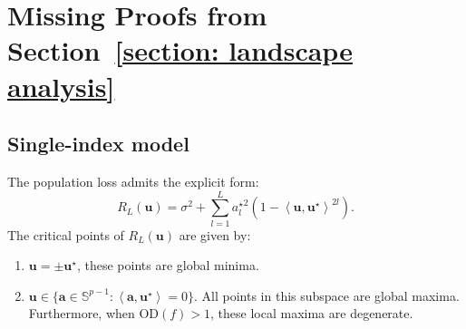 \documentclass[final,12pt]{colt2018} %
\newcommand{\sd}[1]{\text{OD}(#1)}
\newcommand{\unitsphere}[1]{\mathbb{S}^{#1}}
\renewcommand\v[1]{{\ensuremath{\boldsymbol{#1}}}}
\newcommand\ip[1]{\left\langle #1 \right\rangle}
\begin{document}





\appendix

\section{Missing Proofs from Section~\ref{section: landscape analysis}}
\label{section: proofs for landscape analysis}

\subsection{Single-index model}

\begin{theorem}
\label{theorem: landscape_population_loss_restate}
The population loss admits the explicit form: 
$$R_L(\v u)  = \sigma^2 + \sum_{l=1}^L {a_l^\star}^2 (1-\ip{\v u, \v u^\star}^{2l}). $$
The critical points of $ R_L(\v u)$ are given by:
\begin{enumerate}
    \item $\v u = \pm \v u^\star$, these points are global minima. 
    \item $\v u \in \{ \v a \in \unitsphere{p-1}: \ip{\v a, \v u^\star} = 0\}$. All points in this subspace are global maxima. Furthermore, when $\sd{f}>1$, these local maxima are degenerate. 
\end{enumerate}
\end{theorem}
\end{document}
